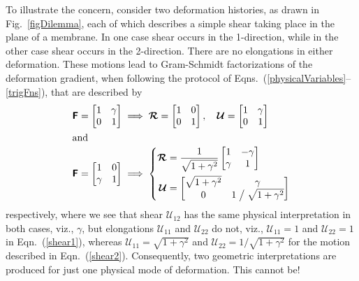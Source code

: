 To illustrate the concern, consider two deformation histories, as drawn in Fig.~\ref{figDilemma}, each of which describes a simple shear taking place in the plane of a membrane.  In one case shear occurs in the 1-direction, while in the other case shear occurs in the 2-direction.  There are no elongations in either deformation.  These motions lead to Gram-Schmidt factorizations of the deformation gradient, when following the protocol of Eqns.~(\ref{physicalVariables}--\ref{trigFns}), that are described by
\begin{subequations}
	\label{shears}
	\begin{align}
	\mathbfsf{F} = 
	\begin{bmatrix} 1 & \gamma \\ 0 & 1 \end{bmatrix} & \implies 
	\boldsymbol{\mathcal{R}} = 
	\begin{bmatrix} 1 & 0 \\ 0 & 1 \end{bmatrix} , \quad
	\boldsymbol{\mathcal{U}} = 
	\begin{bmatrix} 1 & \gamma \\ 0 & 1  \end{bmatrix} 
	\label{shear1} \\
	\intertext{and}
	\mathbfsf{F} = 
	\begin{bmatrix} 1 & 0 \\ \gamma & 1 \end{bmatrix} & \implies \left\{
	\begin{aligned} \mbox{}
	\boldsymbol{\mathcal{R}} & = \frac{1}{\sqrt{1 + \gamma^2}}
	\begin{bmatrix} 1 & -\gamma \\ \gamma & 1 \end{bmatrix} \\
	\boldsymbol{\mathcal{U}} & = 
	\begin{bmatrix} \sqrt{1 + \gamma^2} & \gamma \\ 
	0 & 1 \bigm/ \sqrt{1 + \gamma^2} \end{bmatrix}
	\end{aligned} \right.
	\label{shear2}
	\end{align}
\end{subequations}
respectively, where we see that shear $\mathcal{U}_{12}$ has the same physical interpretation in both cases, viz., $\gamma$, but elongations $\mathcal{U}_{11}$ and $\mathcal{U}_{22}$ do not, viz., $\mathcal{U}_{11}=1$ and $\mathcal{U}_{22}=1$ in Eqn.~(\ref{shear1}), whereas $\mathcal{U}_{11} = \sqrt{1 + \gamma^2}$ and $\mathcal{U}_{22} = 1 / \sqrt{1 + \gamma^2}$ for the motion described in Eqn.~(\ref{shear2}).  Consequently, two geometric interpretations are produced for just one physical mode of deformation.  This cannot be!

